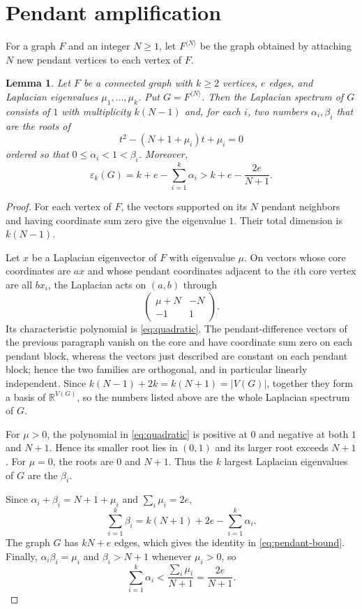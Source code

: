 \documentclass[11pt]{amsart}
\newtheorem{lemma}[theorem]{Lemma}
\theoremstyle{remark}
\newcommand{\eps}{\varepsilon}
\begin{document}
\section{Pendant amplification}

For a graph $F$ and an integer $N\ge1$, let $F^{\langle N\rangle}$ be the
graph obtained by attaching $N$ new pendant vertices to each vertex of $F$.

\begin{lemma}\label{lem:pendant}
Let $F$ be a connected graph with $k\ge2$ vertices, $e$ edges, and Laplacian
eigenvalues $\mu_1,\ldots,\mu_k$. Put $G=F^{\langle N\rangle}$. Then the
Laplacian spectrum of $G$ consists of $1$ with multiplicity $k(N-1)$ and,
for each $i$, two numbers $\alpha_i,\beta_i$ that are the roots of
\begin{equation}\label{eq:quadratic}
  t^2-(N+1+\mu_i)t+\mu_i=0
\end{equation}
ordered so that $0\le\alpha_i<1<\beta_i$. Moreover,
\begin{equation}\label{eq:pendant-bound}
  \eps_k(G)
  =k+e-\sum_{i=1}^k\alpha_i
  >k+e-\frac{2e}{N+1}.
\end{equation}
\end{lemma}

\begin{proof}
For each vertex of $F$, the vectors supported on its $N$ pendant neighbors
and having coordinate sum zero give the eigenvalue $1$. Their total dimension
is $k(N-1)$.

Let $x$ be a Laplacian eigenvector of $F$ with eigenvalue $\mu$. On vectors
whose core coordinates are $ax$ and whose pendant coordinates adjacent to the
$i$th core vertex are all $bx_i$, the Laplacian acts on $(a,b)$ through
\[
\begin{pmatrix}
\mu+N&-N\\
-1&1
\end{pmatrix}.
\]
Its characteristic polynomial is \eqref{eq:quadratic}. The pendant-difference
vectors of the previous paragraph vanish on the core and have coordinate sum
zero on each pendant block, whereas the vectors just described are constant on
each pendant block; hence the two families are orthogonal, and in particular
linearly independent. Since $k(N-1)+2k=k(N+1)=|V(G)|$, together they form a
basis of $\mathbb{R}^{V(G)}$, so the numbers listed above are the whole
Laplacian spectrum of $G$.

For $\mu>0$, the polynomial in \eqref{eq:quadratic} is positive at $0$ and
negative at both $1$ and $N+1$. Hence its smaller root lies in $(0,1)$ and
its larger root exceeds $N+1$. For $\mu=0$, the roots are $0$ and $N+1$.
Thus the $k$ largest Laplacian eigenvalues of $G$ are the $\beta_i$.

Since $\alpha_i+\beta_i=N+1+\mu_i$ and $\sum_i\mu_i=2e$,
\[
\sum_{i=1}^k\beta_i
=k(N+1)+2e-\sum_{i=1}^k\alpha_i.
\]
The graph $G$ has $kN+e$ edges, which gives the identity in
\eqref{eq:pendant-bound}. Finally,
$\alpha_i\beta_i=\mu_i$ and $\beta_i>N+1$ whenever $\mu_i>0$, so
\[
\sum_{i=1}^k\alpha_i
<\frac{\sum_i\mu_i}{N+1}
=\frac{2e}{N+1}.
\]
\end{proof}
\end{document}
